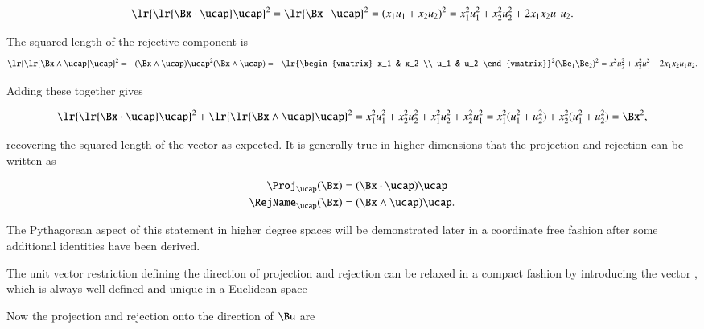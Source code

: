 \begin{dmath}\label{eqn:SimpleProducts2:740}
\lr{ \lr{\Bx \cdot \ucap } \ucap }^2
=
\lr{\Bx \cdot \ucap }^2
=
(x_1 u_1 + x_2 u_2)^2
=
x_1^2 u_1^2 + x_2^2 u_2^2 + 2 x_1 x_2 u_1 u_2.
\end{dmath}

The squared length of the rejective component is
\begin{dmath}\label{eqn:SimpleProducts2:760}
\lr{ \lr{\Bx \wedge \ucap } \ucap }^2
=
-(\Bx \wedge \ucap) \ucap^2 (\Bx \wedge \ucap)
=
-
\lr{\begin{vmatrix}
   x_1 & x_2 \\
   u_1 & u_2
\end{vmatrix}}^2
(\Be_1 \Be_2)^2
=
x_1^2 u_2^2 + x_2^2 u_1^2 - 2 x_1 x_2 u_1 u_2.
\end{dmath}

Adding these together gives

\begin{dmath}\label{eqn:SimpleProducts2:780}
\lr{ \lr{\Bx \cdot \ucap } \ucap }^2 + \lr{ \lr{\Bx \wedge \ucap } \ucap }^2
=
x_1^2 u_1^2 + x_2^2 u_2^2
+x_1^2 u_2^2 + x_2^2 u_1^2
=
x_1^2 ( u_1^2 + u_2^2 )
+
x_2^2 ( u_1^2 + u_2^2 )
=
\Bx^2,
\end{dmath}

recovering the squared length of the vector as expected.  It is generally true in higher dimensions that the projection and rejection can be written as

\begin{dmath}\label{eqn:SimpleProducts2:800}
\begin{aligned}
\Proj_\ucap(\Bx) &= (\Bx \cdot \ucap) \ucap \\
\RejName_\ucap(\Bx) &= (\Bx \wedge \ucap) \ucap.
\end{aligned}
\end{dmath}

The Pythagorean aspect of this statement in higher degree spaces
will be demonstrated later in a coordinate free fashion after some additional identities have been derived.

The unit vector restriction defining the direction of projection and rejection can be relaxed in a compact fashion by introducing the vector , which is always well defined and unique in a Euclidean space


Now the projection and rejection onto the direction of \( \Bu \) are

